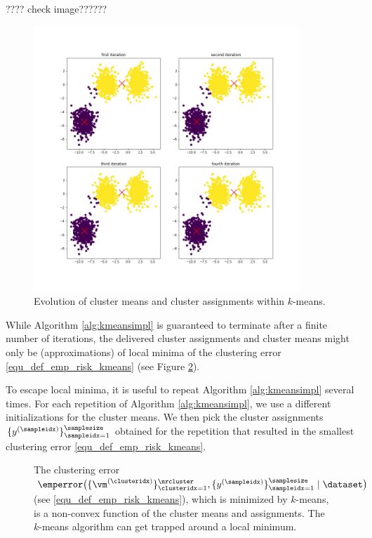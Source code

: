 \documentclass[12pt]{report}
\begin{document}
???? check image??????
\begin{figure}[htbp]
\begin{center}
\includegraphics[width=10cm]{EvolKmeans.jpg}  
\vspace*{-6mm}
\end{center}
\caption{Evolution of cluster means and cluster assignments within $k$-means.}
\label{fig:first_iter_kmeans}
\end{figure}

While Algorithm \ref{alg:kmeansimpl} is guaranteed to terminate after a 
finite number of iterations, the delivered cluster assignments and cluster 
means might only be (approximations) of local minima of the clustering error 
\eqref{equ_def_emp_risk_kmeans} (see Figure \ref{fig_emp_risk_k_means}). 

To escape local minima, it is useful to repeat Algorithm \ref{alg:kmeansimpl} several times. 
For each repetition of Algorithm \ref{alg:kmeansimpl}, we use a different initializations for 
the cluster means. We then pick the cluster assignments $\{ y^{(\sampleidx)} \}_{\sampleidx=1}^{\samplesize}$ 
obtained for the repetition that resulted in the smallest clustering error \eqref{equ_def_emp_risk_kmeans}. 

\begin{figure}[htbp]
\begin{center}
\end{center}
\caption{The clustering error $\emperror \big( \{\vm^{(\clusteridx)}\}_{\clusteridx=1}^{\nrcluster},\{y^{(\sampleidx)}\}_{\sampleidx=1}^{\samplesize} \mid \dataset \big)$ (see \eqref{equ_def_emp_risk_kmeans}), 
which is minimized by $k$-means, is a non-convex function of 
the cluster means and assignments. The $k$-means algorithm 
can get trapped around a local minimum.} \label{fig_emp_risk_k_means}
\end{figure}
\end{document}
